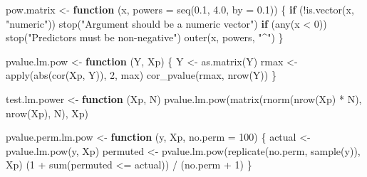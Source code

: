 \documentclass[
  letterpaper,
  DIV=11,
  numbers=noendperiod]{scrreprt}
\newenvironment{Shaded}{\begin{snugshade}}{\end{snugshade}}
\newcommand{\AttributeTok}[1]{\textcolor[rgb]{0.40,0.45,0.13}{#1}}
\newcommand{\ControlFlowTok}[1]{\textcolor[rgb]{0.00,0.23,0.31}{\textbf{#1}}}
\newcommand{\DecValTok}[1]{\textcolor[rgb]{0.68,0.00,0.00}{#1}}
\newcommand{\FloatTok}[1]{\textcolor[rgb]{0.68,0.00,0.00}{#1}}
\newcommand{\FunctionTok}[1]{\textcolor[rgb]{0.28,0.35,0.67}{#1}}
\newcommand{\NormalTok}[1]{\textcolor[rgb]{0.00,0.23,0.31}{#1}}
\newcommand{\OtherTok}[1]{\textcolor[rgb]{0.00,0.23,0.31}{#1}}
\newcommand{\SpecialCharTok}[1]{\textcolor[rgb]{0.37,0.37,0.37}{#1}}
\newcommand{\StringTok}[1]{\textcolor[rgb]{0.13,0.47,0.30}{#1}}
\begin{document}
\begin{Shaded}
\begin{Highlighting}[]
\NormalTok{pow.matrix }\OtherTok{\textless{}{-}} \ControlFlowTok{function}\NormalTok{ (x, }\AttributeTok{powers =} \FunctionTok{seq}\NormalTok{(}\FloatTok{0.1}\NormalTok{, }\FloatTok{4.0}\NormalTok{, }\AttributeTok{by =} \FloatTok{0.1}\NormalTok{))}
\NormalTok{\{}
    \ControlFlowTok{if}\NormalTok{ (}\SpecialCharTok{!}\FunctionTok{is.vector}\NormalTok{(x, }\StringTok{"numeric"}\NormalTok{)) }\FunctionTok{stop}\NormalTok{(}\StringTok{"Argument should be a numeric vector"}\NormalTok{)}
    \ControlFlowTok{if}\NormalTok{ (}\FunctionTok{any}\NormalTok{(x }\SpecialCharTok{\textless{}} \DecValTok{0}\NormalTok{)) }\FunctionTok{stop}\NormalTok{(}\StringTok{"Predictors must be non{-}negative"}\NormalTok{)}
    \FunctionTok{outer}\NormalTok{(x, powers, }\StringTok{"\^{}"}\NormalTok{)}
\NormalTok{\}}

\NormalTok{pvalue.lm.pow }\OtherTok{\textless{}{-}} \ControlFlowTok{function}\NormalTok{ (Y, Xp)}
\NormalTok{\{}
\NormalTok{    Y }\OtherTok{\textless{}{-}} \FunctionTok{as.matrix}\NormalTok{(Y)}
\NormalTok{    rmax }\OtherTok{\textless{}{-}} \FunctionTok{apply}\NormalTok{(}\FunctionTok{abs}\NormalTok{(}\FunctionTok{cor}\NormalTok{(Xp, Y)), }\DecValTok{2}\NormalTok{, max)}
    \FunctionTok{cor\_pvalue}\NormalTok{(rmax, }\FunctionTok{nrow}\NormalTok{(Y))}
\NormalTok{\}}

\NormalTok{test.lm.power }\OtherTok{\textless{}{-}} \ControlFlowTok{function}\NormalTok{ (Xp, N)}
    \FunctionTok{pvalue.lm.pow}\NormalTok{(}\FunctionTok{matrix}\NormalTok{(}\FunctionTok{rnorm}\NormalTok{(}\FunctionTok{nrow}\NormalTok{(Xp) }\SpecialCharTok{*}\NormalTok{ N), }\FunctionTok{nrow}\NormalTok{(Xp), N), Xp)}

\NormalTok{pvalue.perm.lm.pow }\OtherTok{\textless{}{-}} \ControlFlowTok{function}\NormalTok{ (y, Xp, }\AttributeTok{no.perm =} \DecValTok{100}\NormalTok{)}
\NormalTok{\{}
\NormalTok{    actual }\OtherTok{\textless{}{-}} \FunctionTok{pvalue.lm.pow}\NormalTok{(y, Xp)}
\NormalTok{    permuted }\OtherTok{\textless{}{-}} \FunctionTok{pvalue.lm.pow}\NormalTok{(}\FunctionTok{replicate}\NormalTok{(no.perm, }\FunctionTok{sample}\NormalTok{(y)), Xp)}
\NormalTok{    (}\DecValTok{1} \SpecialCharTok{+} \FunctionTok{sum}\NormalTok{(permuted }\SpecialCharTok{\textless{}=}\NormalTok{ actual)) }\SpecialCharTok{/}\NormalTok{ (no.perm }\SpecialCharTok{+} \DecValTok{1}\NormalTok{)}
\NormalTok{\}}


\end{Highlighting}
\end{Shaded}
\end{document}
